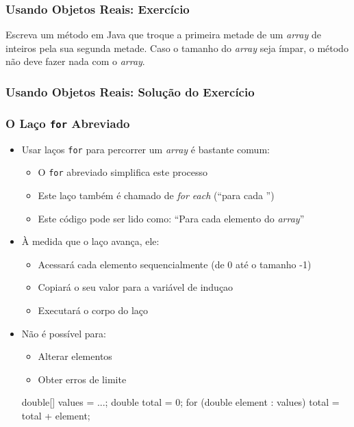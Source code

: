 \documentclass[xcolor={dvipsnames,table},aspectratio=169]{beamer}
\begin{document}
\begin{frame}\frametitle{Usando Objetos Reais: Exercício}
Escreva um método em Java que troque a primeira metade de um \emph{array} de inteiros pela sua segunda metade. Caso o tamanho do \emph{array} seja ímpar, o método não deve fazer nada com o \emph{array}.
\end{frame}

\begin{frame}[fragile]\frametitle{Usando Objetos Reais: Solução do Exercício}
{\scriptsize
{}
}
\end{frame}

\begin{frame}[fragile]\frametitle{O Laço \texttt{for} Abreviado }
\begin{itemize}
	\item Usar laços \texttt{for} para percorrer um \emph{array} é bastante comum:
	\begin{itemize}
		\item O \texttt{for} abreviado simplifica este processo
		\item Este laço também é chamado de \emph{for each} (``para cada '')
		\item Este código pode ser lido como: ``Para cada elemento do \emph{array}''
	\end{itemize}
	\item À medida que o laço avança, ele:
	\begin{itemize}
		\item Acessará cada elemento sequencialmente (de 0 até o tamanho -1)
		\item Copiará o seu valor para a variável de induçao
		\item Executará o corpo do laço
	\end{itemize}
	\item Não é possível para:
	\begin{itemize}
		\item Alterar elementos
		\item Obter erros de limite
	\end{itemize}
{\scriptsize
\begin{javacode}
double[] values = ...;
double total = 0;
for (double element : values) {
  total = total + element;
}
\end{javacode}
}
\end{itemize}
\end{frame}
\end{document}

